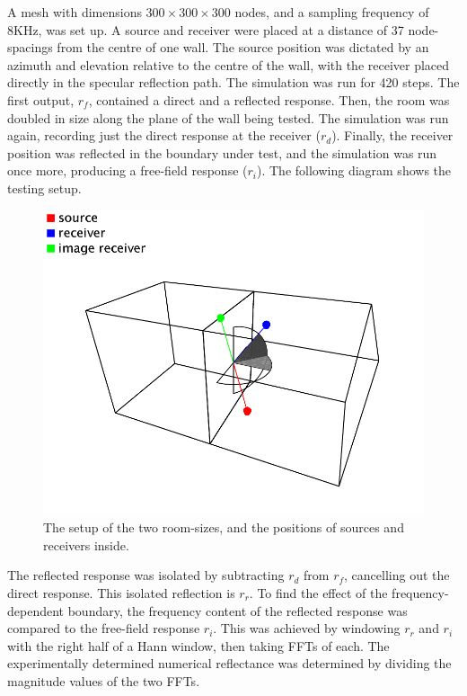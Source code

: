 \documentclass[]{scrreprt}
\begin{document}
A mesh with dimensions \(300 \times 300 \times 300\) nodes, and a
sampling frequency of 8KHz, was set up. A source and receiver were
placed at a distance of 37 node-spacings from the centre of one wall.
The source position was dictated by an azimuth and elevation relative to
the centre of the wall, with the receiver placed directly in the
specular reflection path. The simulation was run for 420 steps. The
first output, \(r_f\), contained a direct and a reflected response.
Then, the room was doubled in size along the plane of the wall being
tested. The simulation was run again, recording just the direct response
at the receiver (\(r_d\)). Finally, the receiver position was reflected
in the boundary under test, and the simulation was run once more,
producing a free-field response (\(r_i\)). The following diagram
\text{(\ref{fig:boundary_test_setup})} shows the testing setup.

\begin{figure}[htbp]
\centering
\includegraphics{images/boundary_testing_setup.pdf}
\caption{The setup of the two room-sizes, and the positions of sources
and receivers inside.\label{fig:boundary_test_setup}}
\end{figure}

The reflected response was isolated by subtracting \(r_d\) from \(r_f\),
cancelling out the direct response. This isolated reflection is \(r_r\).
To find the effect of the frequency-dependent boundary, the frequency
content of the reflected response was compared to the free-field
response \(r_i\). This was achieved by windowing \(r_r\) and \(r_i\)
with the right half of a Hann window, then taking FFTs of each. The
experimentally determined numerical reflectance was determined by
dividing the magnitude values of the two FFTs.
\end{document}

